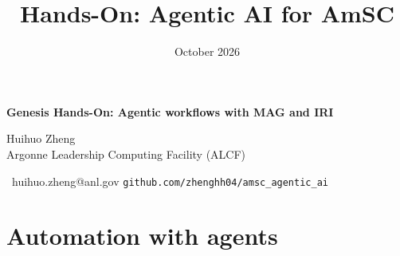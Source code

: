 \documentclass[aspectratio=169,11pt]{beamer}
\title{Hands-On: Agentic AI for AmSC}
\date{October 2026}
\makeatletter
\newcommand{\deckauthor}{Huihuo Zheng}
\newcommand{\deckemail}{huihuo.zheng@anl.gov}
\newcommand{\deckinstitute}{Argonne Leadership Computing Facility (ALCF)}
\makeatother
\begin{document}
{
\begin{frame}[plain]
  \vfill
  {\Large\bfseries
    Genesis Hands-On: Agentic workflows with MAG and IRI \par}
  \vspace{5pt}
  \vspace{14pt}
  {\small
    \deckauthor\\
    \deckinstitute\\
    \insertdate}
  \vfill
  {\footnotesize\color{midgray}\faEnvelope[regular]\ \deckemail
   \hfill\texttt{github.com/zhenghh04/amsc\_agentic\_ai}\par}
\end{frame}
}

\section{Automation with agents}
\end{document}
